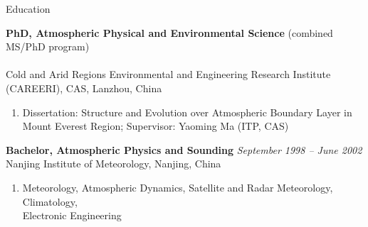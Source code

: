 \documentclass{resume} %
\begin{document}

\begin{rSection}{}
\smallskip
\smallskip
\smallskip
{}
\smallskip
\end{rSection}



\begin{rSection}{Education}

{\bf PhD, Atmospheric Physical and Environmental Science} (combined MS/PhD program)\\
 \\ 
Cold and Arid Regions Environmental and Engineering Research Institute (CAREERI), CAS, Lanzhou, China
\begin{enumerate}[leftmargin=!,labelindent=5pt,itemindent=-15pt]
\item[] Dissertation: Structure and Evolution over Atmospheric Boundary Layer in Mount Everest Region; Supervisor: Yaoming Ma (ITP, CAS)
\end{enumerate}
{\bf Bachelor, Atmospheric Physics and Sounding} \hfill {\em September 1998 -- June 2002}\\
Nanjing Institute of Meteorology, Nanjing, China
\begin{enumerate}[leftmargin=!,labelindent=5pt,itemindent=-15pt]
\item[] Meteorology, Atmospheric Dynamics, Satellite and Radar Meteorology, Climatology,\\
Electronic Engineering
\end{enumerate}
\end{rSection}

\end{document}
